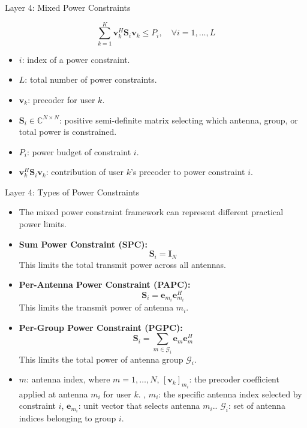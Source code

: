 \documentclass{beamer}
\begin{document}
\begin{frame}{Layer 4: Mixed Power Constraints}
\small

\[
    \sum_{k=1}^{K}
    \mathbf{v}_k^H\mathbf{S}_i\mathbf{v}_k
    \le P_i,
    \quad \forall i=1,\ldots,L
\]

\begin{itemize}
    \item \(i\): index of a power constraint.
    \item \(L\): total number of power constraints.
    \item \(\mathbf{v}_k\): precoder for user \(k\).
    \item \(\mathbf{S}_i\in\mathbb{C}^{N\times N}\): positive semi-definite matrix selecting which antenna, group, or total power is constrained.
    \item \(P_i\): power budget of constraint \(i\).
    \item \(\mathbf{v}_k^H\mathbf{S}_i\mathbf{v}_k\): contribution of user \(k\)'s precoder to power constraint \(i\).
\end{itemize}

\end{frame}
\begin{frame}{Layer 4: Types of Power Constraints}
\small

\begin{itemize}
    \item The mixed power constraint framework can represent different practical power limits.

    \item \textbf{Sum Power Constraint (SPC):}
    \[
        \mathbf{S}_i=\mathbf{I}_N
    \]
    This limits the total transmit power across all antennas.

    \item \textbf{Per-Antenna Power Constraint (PAPC):}
    \[
        \mathbf{S}_i=\mathbf{e}_{m_i}\mathbf{e}_{m_i}^H
    \]
    This limits the transmit power of antenna \(m_i\).

    \item \textbf{Per-Group Power Constraint (PGPC):}
    \[
        \mathbf{S}_i=\sum_{m\in\mathcal{G}_i}
        \mathbf{e}_m\mathbf{e}_m^H
    \]
    This limits the total power of antenna group \(\mathcal{G}_i\).

\item \(m\): antenna index, where \(m=1,\ldots,N\), \([\mathbf{v}_k]_{m_i}\): the precoder coefficient applied at antenna \(m_i\) for user \(k\).
, \(m_i\): the specific antenna index selected by constraint \(i\), \(\mathbf{e}_{m_i}\): unit vector that selects antenna \(m_i\)..
\(\mathcal{G}_i\): set of antenna indices belonging to group \(i\).



\end{itemize}

\end{frame}
\end{document}
